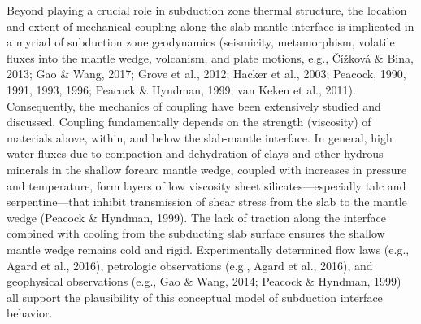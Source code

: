\documentclass[draft,linenumbers]{agujournal2018}
\begin{document}
Beyond playing a crucial role in subduction zone thermal structure, the
location and extent of mechanical coupling along the slab-mantle
interface is implicated in a myriad of subduction zone geodynamics
(seismicity, metamorphism, volatile fluxes into the mantle wedge,
volcanism, and plate motions, e.g., Čížková \& Bina, 2013; Gao \& Wang,
2017; Grove et al., 2012; Hacker et al., 2003; Peacock, 1990, 1991,
1993, 1996; Peacock \& Hyndman, 1999; van Keken et al., 2011).
Consequently, the mechanics of coupling have been extensively studied
and discussed. Coupling fundamentally depends on the strength
(viscosity) of materials above, within, and below the slab-mantle
interface. In general, high water fluxes due to compaction and
dehydration of clays and other hydrous minerals in the shallow forearc
mantle wedge, coupled with increases in pressure and temperature, form
layers of low viscosity sheet silicates---especially talc and
serpentine---that inhibit transmission of shear stress from the slab to
the mantle wedge (Peacock \& Hyndman, 1999). The lack of traction along
the interface combined with cooling from the subducting slab surface
ensures the shallow mantle wedge remains cold and rigid. Experimentally
determined flow laws (e.g., Agard et al., 2016), petrologic observations
(e.g., Agard et al., 2016), and geophysical observations (e.g., Gao \&
Wang, 2014; Peacock \& Hyndman, 1999) all support the plausibility of
this conceptual model of subduction interface behavior.
\end{document}
